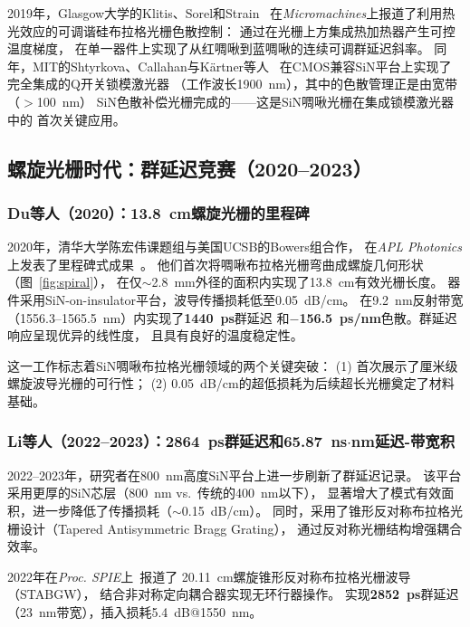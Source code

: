 \documentclass[12pt,a4paper,twoside]{article}
\begin{document}
2019年，Glasgow大学的Klitis、Sorel和Strain~\cite{klitis2019}
在\textit{Micromachines}上报道了利用热光效应的可调谐硅布拉格光栅色散控制：
通过在光栅上方集成热加热器产生可控温度梯度，
在单一器件上实现了从红啁啾到蓝啁啾的连续可调群延迟斜率。
同年，MIT的Shtyrkova、Callahan与K\"{a}rtner等人~\cite{shtyrkova2019}
在CMOS兼容SiN平台上实现了完全集成的Q开关锁模激光器
（工作波长1900~nm），其中的色散管理正是由宽带（$>$100~nm）
SiN色散补偿光栅完成的——这是SiN啁啾光栅在集成锁模激光器中的
首次关键应用。

\subsection{螺旋光栅时代：群延迟竞赛（2020--2023）}

\subsubsection{Du等人（2020）：13.8~cm螺旋光栅的里程碑}

2020年，清华大学陈宏伟课题组与美国UCSB的Bowers组合作，
在\textit{APL Photonics}上发表了里程碑式成果~\cite{du2020}。
他们首次将啁啾布拉格光栅弯曲成螺旋几何形状（图~\ref{fig:spiral}），
在仅$\sim$2.8~mm外径的面积内实现了13.8~cm有效光栅长度。
器件采用SiN-on-insulator平台，波导传播损耗低至\SI{0.05}{dB/cm}。
在9.2~nm反射带宽（1556.3--1565.5~nm）内实现了\textbf{1440~ps}群延迟
和\textbf{$-$156.5~ps/nm}色散。群延迟响应呈现优异的线性度，
且具有良好的温度稳定性。

这一工作标志着SiN啁啾布拉格光栅领域的两个关键突破：
(1) 首次展示了厘米级螺旋波导光栅的可行性；
(2) \SI{0.05}{dB/cm}的超低损耗为后续超长光栅奠定了材料基础。

\subsubsection{Li等人（2022--2023）：2864~ps群延迟和65.87~ns$\cdot$nm延迟-带宽积}

2022--2023年，研究者在800~nm高度SiN平台上进一步刷新了群延迟记录。
该平台采用更厚的SiN芯层（800~nm vs.\ 传统的400~nm以下），
显著增大了模式有效面积，进一步降低了传播损耗（$\sim$\SI{0.15}{dB/cm}）。
同时，采用了锥形反对称布拉格光栅设计（Tapered Antisymmetric Bragg Grating），
通过反对称光栅结构增强耦合效率。

2022年在\textit{Proc. SPIE}上~\cite{li2022}报道了
20.11~cm螺旋锥形反对称布拉格光栅波导（STABGW），
结合非对称定向耦合器实现无环行器操作。
实现\textbf{2852~ps}群延迟（23~nm带宽），插入损耗5.4~dB@1550~nm。
\end{document}

